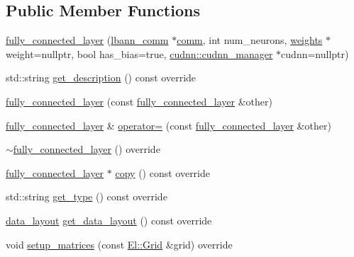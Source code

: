 \subsection*{Public Member Functions}
\begin{DoxyCompactItemize}
\item 
\hyperlink{classlbann_1_1fully__connected__layer_ae5d9a0f2851f3c55abe47aa65afbe66c}{fully\+\_\+connected\+\_\+layer} (\hyperlink{classlbann_1_1lbann__comm}{lbann\+\_\+comm} $\ast$\hyperlink{file__io_8cpp_ab048c6f9fcbcfaa57ce68b00263dbebe}{comm}, int num\+\_\+neurons, \hyperlink{classlbann_1_1weights}{weights} $\ast$weight=nullptr, bool has\+\_\+bias=true, \hyperlink{classlbann_1_1cudnn_1_1cudnn__manager}{cudnn\+::cudnn\+\_\+manager} $\ast$cudnn=nullptr)
\item 
std\+::string \hyperlink{classlbann_1_1fully__connected__layer_a7ce678ec7560dd145244ffd8813d5edb}{get\+\_\+description} () const override
\item 
\hyperlink{classlbann_1_1fully__connected__layer_a377e44ab7eccb1aec467be5667bef6fe}{fully\+\_\+connected\+\_\+layer} (const \hyperlink{classlbann_1_1fully__connected__layer}{fully\+\_\+connected\+\_\+layer} \&other)
\item 
\hyperlink{classlbann_1_1fully__connected__layer}{fully\+\_\+connected\+\_\+layer} \& \hyperlink{classlbann_1_1fully__connected__layer_ab06d01021d4e89cd2f4f64c330e7cc31}{operator=} (const \hyperlink{classlbann_1_1fully__connected__layer}{fully\+\_\+connected\+\_\+layer} \&other)
\item 
\hyperlink{classlbann_1_1fully__connected__layer_a5b133629f448a289bba6ebb6ab13941d}{$\sim$fully\+\_\+connected\+\_\+layer} () override
\item 
\hyperlink{classlbann_1_1fully__connected__layer}{fully\+\_\+connected\+\_\+layer} $\ast$ \hyperlink{classlbann_1_1fully__connected__layer_a7e838b85cb7bf075def5a88fba2ace20}{copy} () const override
\item 
std\+::string \hyperlink{classlbann_1_1fully__connected__layer_abd51271a19a8cce44ba4f2d11eaaaee7}{get\+\_\+type} () const override
\item 
\hyperlink{base_8hpp_a786677cbfb3f5677b4d84f3056eb08db}{data\+\_\+layout} \hyperlink{classlbann_1_1fully__connected__layer_a0d84bbfa7df80e879da13f54d465a603}{get\+\_\+data\+\_\+layout} () const override
\item 
void \hyperlink{classlbann_1_1fully__connected__layer_a4f26e5923a82f11c2c7658a27903f83b}{setup\+\_\+matrices} (const \hyperlink{base_8hpp_a9951bb1719d534e0401b1f06cad19eab}{El\+::\+Grid} \&grid) override

\end{DoxyCompactItemize}

